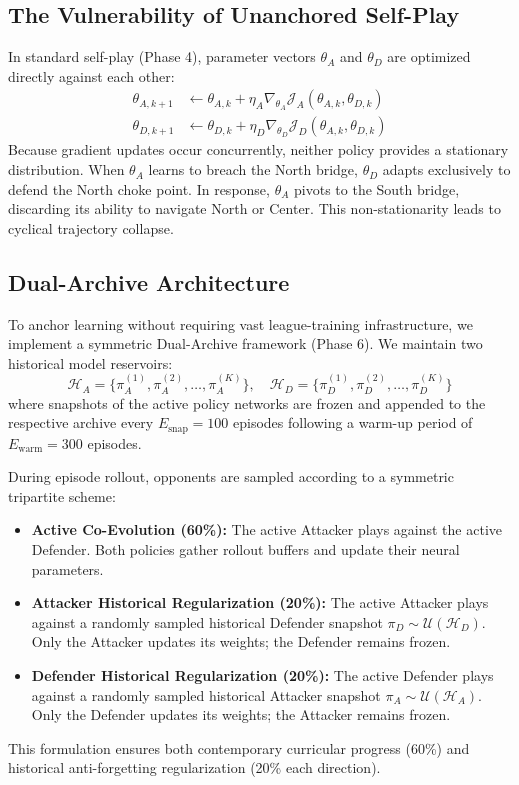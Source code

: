 \documentclass[conference]{IEEEtran}
\begin{document}
\subsection{The Vulnerability of Unanchored Self-Play}
In standard self-play (Phase 4), parameter vectors $\theta_A$ and $\theta_D$ are optimized directly against each other:
\begin{align}
\theta_{A, k+1} &\leftarrow \theta_{A, k} + \eta_A \nabla_{\theta_A} \mathcal{J}_A(\theta_{A, k}, \theta_{D, k}) \\
\theta_{D, k+1} &\leftarrow \theta_{D, k} + \eta_D \nabla_{\theta_D} \mathcal{J}_D(\theta_{A, k}, \theta_{D, k})
\end{align}
Because gradient updates occur concurrently, neither policy provides a stationary distribution. When $\theta_{A}$ learns to breach the North bridge, $\theta_D$ adapts exclusively to defend the North choke point. In response, $\theta_A$ pivots to the South bridge, discarding its ability to navigate North or Center. This non-stationarity leads to cyclical trajectory collapse.

\subsection{Dual-Archive Architecture}
To anchor learning without requiring vast league-training infrastructure, we implement a symmetric Dual-Archive framework (Phase 6). We maintain two historical model reservoirs:
\begin{equation}
\mathcal{H}_A = \{\pi_A^{(1)}, \pi_A^{(2)}, \dots, \pi_A^{(K)}\}, \quad \mathcal{H}_D = \{\pi_D^{(1)}, \pi_D^{(2)}, \dots, \pi_D^{(K)}\}
\end{equation}
where snapshots of the active policy networks are frozen and appended to the respective archive every $E_{\text{snap}} = 100$ episodes following a warm-up period of $E_{\text{warm}} = 300$ episodes.

During episode rollout, opponents are sampled according to a symmetric tripartite scheme:
\begin{itemize}
    \item \textbf{Active Co-Evolution (60\%):} The active Attacker plays against the active Defender. Both policies gather rollout buffers and update their neural parameters.
    \item \textbf{Attacker Historical Regularization (20\%):} The active Attacker plays against a randomly sampled historical Defender snapshot $\pi_D \sim \mathcal{U}(\mathcal{H}_D)$. Only the Attacker updates its weights; the Defender remains frozen.
    \item \textbf{Defender Historical Regularization (20\%):} The active Defender plays against a randomly sampled historical Attacker snapshot $\pi_A \sim \mathcal{U}(\mathcal{H}_A)$. Only the Defender updates its weights; the Attacker remains frozen.
\end{itemize}
This formulation ensures both contemporary curricular progress (60\%) and historical anti-forgetting regularization (20\% each direction).
\end{document}
